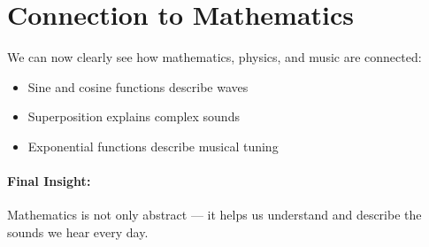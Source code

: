 \section{Connection to Mathematics}

We can now clearly see how mathematics, physics, and music are connected:

\begin{itemize}
    \item Sine and cosine functions describe waves
    \item Superposition explains complex sounds
    \item Exponential functions describe musical tuning
\end{itemize}

\paragraph{Final Insight:}
Mathematics is not only abstract — it helps us understand and describe the sounds we hear every day.
